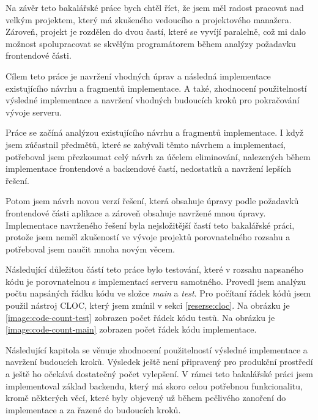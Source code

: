 


Na závěr teto bakalářské práce bych chtěl říct, že jsem měl radost pracovat nad velkým projektem, který má zkušeného vedoucího a projektového manažera. Zároveň, projekt je rozdělen do dvou častí, které se vyvíjí paralelně, což mi dalo možnost spolupracovat se skvělým programátorem během analýzy požadavku frontendové části.

Cílem teto práce je navržení vhodných úprav a následná implementace existujícího návrhu a fragmentů implementace. A také, zhodnocení použitelností výsledné implementace a navržení vhodných budoucích kroků pro pokračování vývoje serveru.

Práce se začíná analýzou existujícího návrhu a fragmentů implementace. I když jsem zúčastnil předmětů, které se zabývali těmto návrhem a implementací, potřeboval jsem přezkoumat celý návrh za účelem eliminování, nalezených během implementace frontendové a backendové častí, nedostatků a navržení lepších řešení.

Potom jsem návrh novou verzí řešení, která obsahuje úpravy podle požadavků frontendové části aplikace a zároveň obsahuje navržené mnou úpravy. Implementace navrženého řešení byla nejsložitější častí teto bakalářské práci, protože jsem neměl zkušeností ve vývoje projektů porovnatelného rozsahu a potřeboval jsem naučit mnoha novým věcem.
 
Následující důležitou částí teto práce bylo testování, které v rozsahu napsaného kódu je porovnatelnou s implementací serveru samotného. Provedl jsem analýzu počtu napsáných řádku kódu ve složce \textit{main} a \textit{test}. Pro počítaní řádek kódů jsem použil nástroj CLOC, který jsem zmínil v sekci \ref{reserse:cloc}. Na obrázku je \ref{image:code-count-test} zobrazen počet řádek kódu testů. Na obrázku je \ref{image:code-count-main} zobrazen počet řádek kódu implementace.

Následující kapitola se věnuje zhodnocení použitelností výsledné implementace a navržení budoucích kroků. Výsledek ještě není připravený pro produkční prostředí a ještě ho očekává dostatečný počet vylepšení. V rámci teto bakalářské práci jsem implementoval základ backendu, který má skoro celou potřebnou funkcionalitu, kromě některých věcí, které byly objevený už během pečlivého zanoření do implementace a za
řazené do budoucích kroků.